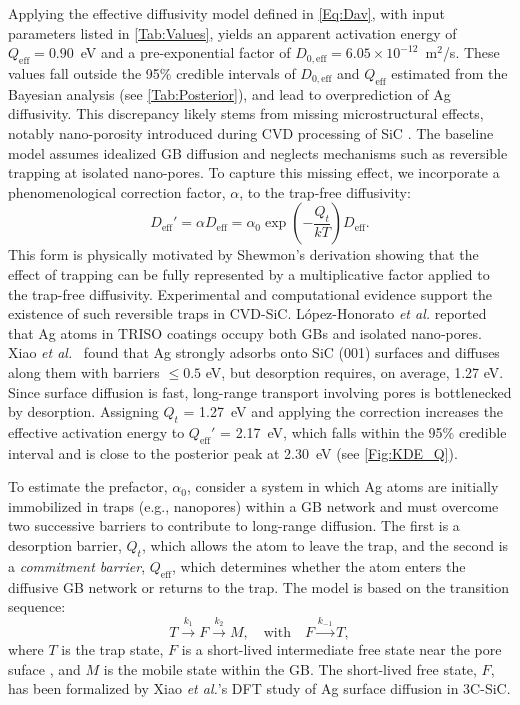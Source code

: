 \documentclass[%
preprint,
amsmath,amssymb,
aps,
]{revtex4-2}
\newcommand{\?}{\stackrel{?}{=}}
\begin{document}
Applying the effective diffusivity model defined in \cref{Eq:Dav}, with input parameters listed in \cref{Tab:Values}, yields an apparent activation energy of $Q_{\text{eff}} = 0.90$~eV and a pre-exponential factor of $D_{0,\text{eff}} = 6.05 \times 10^{-12}$~m$^2$/s. These values fall outside the 95\% credible intervals of $D_{0,\text{eff}}$ and $Q_\text{eff}$ estimated from the Bayesian analysis (see \cref{Tab:Posterior}), and lead to overprediction of Ag diffusivity. This discrepancy likely stems from missing microstructural effects, notably nano-porosity introduced during CVD processing of SiC \cite{Lopez-Honorato2010,Lopez-Honorato2011,Xiao2012}. The baseline model assumes idealized GB diffusion and neglects mechanisms such as reversible trapping at isolated nano-pores. To capture this missing effect, we incorporate a phenomenological correction factor, $\alpha$, to the trap-free diffusivity:
\begin{equation}
D_\text{eff}' = \alpha D_\text{eff} = \alpha_0 \exp\left( -\frac{Q_t}{kT} \right) D_\text{eff}.
\end{equation}
This form is physically motivated by Shewmon’s derivation \cite{Shewmon2016} showing that the effect of trapping can be fully represented by a multiplicative factor applied to the trap-free diffusivity. Experimental and computational evidence support the existence of such reversible traps in CVD-SiC. López-Honorato \textit{et al.} \cite{Lopez-Honorato2010,Lopez-Honorato2011} reported that Ag atoms in TRISO coatings occupy both GBs and isolated nano‑pores. Xiao \textit{et al.}~\cite{Xiao2012} found that Ag strongly adsorbs onto SiC (001) surfaces and diffuses along them with barriers $\leq 0.5$ eV, but desorption requires, on average, 1.27 eV. Since surface diffusion is fast, long-range transport involving pores is bottlenecked by desorption. Assigning $Q_t$ = 1.27~eV and applying the correction increases the effective activation energy to $Q_\text{eff}'$ = 2.17~eV, which falls within the 95\% credible interval and is close to the posterior peak at 2.30~eV (see \cref{Fig:KDE_Q}).

To estimate the prefactor, $\alpha_0$, consider a system in which Ag atoms are initially immobilized in traps (e.g., nanopores) within a GB network and must overcome two successive barriers to contribute to long-range diffusion. The first is a desorption barrier, $Q_t$, which allows the atom to leave the trap, and the second is a \textit{commitment barrier}, $Q_{\text{eff}}$, which determines whether the atom enters the diffusive GB network or returns to the trap. The model is based on the transition sequence:
\begin{equation}
T \xrightarrow{k_1} F \xrightarrow{k_2} M, \quad \text{with} \quad F \xrightarrow{k_{-1}} T,
\end{equation}
where $T$ is the trap state, $F$ is a short-lived intermediate free state near the pore suface \cite{Xiao2012}, and $M$ is the mobile state within the GB. The short-lived free state, $F$, has been formalized by Xiao \textit{et al.}'s DFT study of Ag surface diffusion in 3C-SiC.
\end{document}

